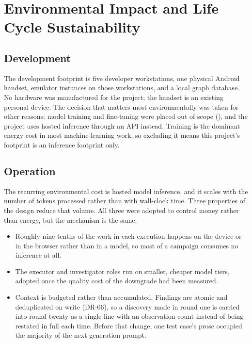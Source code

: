 \section{Environmental Impact and Life Cycle Sustainability}
\label{sec:sustainability}

\subsection*{Development}

The development footprint is five developer workstations, one physical Android
handset, emulator instances on those workstations, and a local graph database.
No hardware was manufactured for the project; the handset is an existing
personal device. The decision that matters most environmentally was taken for
other reasons: model training and fine-tuning were placed out of scope
(), and the project uses hosted inference through an API
instead. Training is the dominant energy cost in most machine-learning work, so
excluding it means this project's footprint is an inference footprint only.

\subsection*{Operation}

The recurring environmental cost is hosted model inference, and it scales with
the number of tokens processed rather than with wall-clock time. Three
properties of the design reduce that volume. All three were adopted to control
money rather than energy, but the mechanism is the same.

\begin{itemize}[leftmargin=1.6em]
  \item Roughly nine tenths of the work in each execution happens on the device
    or in the browser rather than in a model, so most of a campaign consumes no
    inference at all.
  \item The executor and investigator roles run on smaller, cheaper model tiers,
    adopted once the quality cost of the downgrade had been measured.
  \item Context is budgeted rather than accumulated. Findings are atomic and
    deduplicated on write (DR-06), so a discovery made in round one is carried
    into round twenty as a single line with an observation count instead of
    being restated in full each time. Before that change, one test case's
    prose occupied the majority of the next generation prompt.
\end{itemize}

